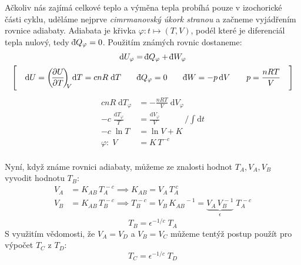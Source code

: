 \documentclass{article}
\def\vph{\vphantom}
\newcommand{\const}[1]{\text{#1}}
\renewcommand{\d}[1]{\const{d} #1}
\newcommand{\pd}[2]{\frac{\partial  #1}{\partial  #2}}
\newcommand{\di}[1]{\mathchar22\mkern-11mu \mathrm{d} #1}
\newcommand{\Pd}[3]{
    \vph{\Bigg|}
    \bigg(
        \hspace{-2pt}
        \pd{#1}{#2}
        \hspace{-2pt}
    \bigg)_{
        \hspace{-3pt} #3
    }
}
\begin{document}
Ačkoliv nás zajímá celkové teplo a výměna tepla probíhá pouze v izochorické části cyklu, uděláme nejprve \textit{cimrmanovský úkork stranou} a začneme vyjádřením rovnice adiabaty. Adiabata je křivka $\varphi: t \mapsto (T,V)$, podél které je diferenciál tepla nulový, tedy $\di{Q}_\varphi = 0$. Použitím známých rovnic dostaneme:
\begin{gather*}
    \d{U}_\varphi = \di{Q}_\varphi + \di{W}_\varphi
    \\
    \Bigg[
    \quad
    \d{U} = \Pd{U}{T}{V} \d{T} = cnR \; \d{T}
    \qquad
    \di{Q}_\varphi = 0
    \qquad
    \di{W} = -p \, \d{V}
    \qquad
    p = \frac{nRT}{V}
    \quad
    \Bigg]
\end{gather*}
\begin{align*}
    cnR \; \d{T}_\varphi &= - \frac{nRT}{V} \; \d{V}_\varphi
    \\[10pt]
    -c \; \frac{ \d{T}_\varphi }{T} &= \frac{ \d{V}_\varphi }{V}
    \qquad\quad /\int \! \d{t}
    \\[10pt]
    -c \; \ln T &= \ln V + K
    \\[10pt]
    \varphi: \; V &= K \, T^{-c}
    \\
\end{align*}

Nyní, když známe rovnici adiabaty, můžeme ze znalosti hodnot $T_A, V_A, V_B$ vyvodit hodnotu $T_B$:
\begin{align*}
    V_A &= K_{AB} \, T_A^{\,-c}
    \implies
    K_{AB} = V_A \, T_A^{\;c}
    \\[3pt]
    V_B &= K_{AB} \, T_B^{\,-c}
    \implies
    T_B^{\,-c} = V_B \, {K_{AB}}^{\!\!-1}
    = \underbrace{V_A \, V_B^{\,-1}}_\epsilon \; T_A^{\,-c}
\end{align*}
\vspace{-1em}
\begin{equation*}
    T_B = \epsilon^{-1/c} \; T_A
\end{equation*}
S využitím vědomosti, že $V_A=V_D$ a $V_B=V_C$ můžeme tentýž postup použít pro výpočet $T_C$ z $T_D$:
\begin{equation*}
    T_C = \epsilon^{-1/c} \; T_D
\end{equation*}

\pagebreak
\end{document}
